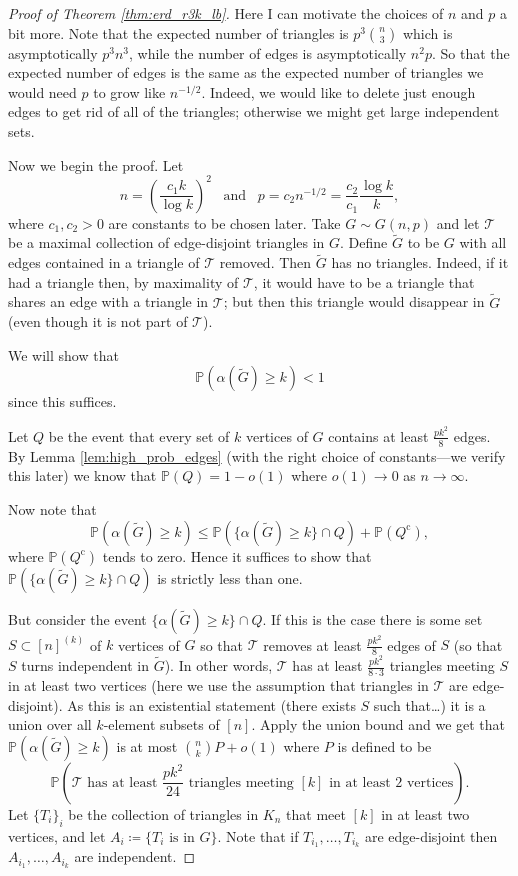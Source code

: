\documentclass{report}
\theoremstyle{definition}
\theoremstyle{plain}
\theoremstyle{definition}
\begin{document}
	\begin{proof}[Proof of Theorem \ref{thm:erd_r3k_lb}]
		Here I can motivate the choices of $n$ and $p$ a bit more. Note that the expected number of triangles is $p^3\binom{n}{3}$ which is asymptotically $p^3n^3$, while the number of edges is asymptotically $n^2p$. So that the expected number of edges is the same as the expected number of triangles we would need $p$ to grow like $n^{-1/2}$. Indeed, we would like to delete just enough edges to get rid of all of the triangles; otherwise we might get large independent sets. 
		
		Now we begin the proof. Let 
		\[
			n = \left(\frac{c_1k}{\log k}\right)^2 \,\,\,\text{ and }\,\,\, p= c_2 n^{-1/2} = \frac{c_2}{c_1} \frac{\log k}{k},
		\]
		where $c_1,c_2>0$ are constants to be chosen later. Take $G\sim G(n,p)$ and let $\mathcal{T}$ be a maximal collection of edge-disjoint triangles in $G$.	Define $\tilde{G}$ to be $G$ with all edges contained in a triangle of $\mathcal{T}$ removed. Then $\tilde{G}$ has no triangles. Indeed, if it had a triangle then, by maximality of $\mathcal{T}$, it would have to be a triangle that shares an edge with a triangle in $\mathcal{T}$; but then this triangle would disappear in $\tilde{G}$ (even though it is not part of $\mathcal{T}$).
		
		We will show that 
		\[
			\mathbb{P}(\alpha(\tilde{G}) \geq k) < 1
		\]
		since this suffices.
		
		Let $Q$ be the event that every set of $k$ vertices of $G$ contains at least $\frac{pk^2}{8}$ edges. By Lemma \ref{lem:high_prob_edges} (with the right choice of constants---we verify this later) we know that $\mathbb{P}(Q) = 1 - o(1)$ where $o(1)\to 0$ as $n\to \infty$.
		
		Now note that 
		\[
			\mathbb{P}(\alpha(\tilde{G}) \geq k) \leq \mathbb{P}(\{\alpha(\tilde{G}) \geq k\}\cap Q) + \mathbb{P}(Q^{\text{c}}),
		\]
		where $\mathbb{P}(Q^{\text{c}})$ tends to zero. Hence it suffices to show that $\mathbb{P}(\{\alpha(\tilde{G}) \geq k\}\cap Q)$ is strictly less than one.
		
		But consider the event $\{\alpha(\tilde{G}) \geq k\}\cap Q$. If this is the case there is some set $S\subset [n]^{(k)}$ of $k$ vertices of $G$ so that $\mathcal{T}$ removes at least $\frac{pk^2}{8}$ edges of $S$ (so that $S$ turns independent in $\tilde{G}$). In other words, $\mathcal{T}$ has at least $\frac{pk^2}{8\cdot 3}$ triangles meeting $S$ in at least two vertices (here we use the assumption that triangles in $\mathcal{T}$ are edge-disjoint). As this is an existential statement (there exists $S$ such that\ldots) it is a union over all $k$-element subsets of $[n]$. Apply the union bound and we get that $\mathbb{P}(\alpha(\tilde{G}) \geq k)$ is at most $\binom{n}{k}P + o(1)$ where $P$ is defined to be
		\[
		 \mathbb{P}\left(\mathcal{T}\text{ has at least }\frac{pk^2}{24}\text{ triangles meeting $[k]$ in at least 2 vertices}\right).
		\]
		Let $\{T_i\}_i$ be the collection of triangles in $K_n$ that meet $[k]$ in at least two vertices, and let $A_i \coloneqq \{T_i\text{ is in }G\}$. Note that if $T_{i_1},\ldots,T_{i_k}$ are edge-disjoint then $A_{i_1},\ldots,A_{i_k}$ are independent.
		

\end{proof}
\end{document}
